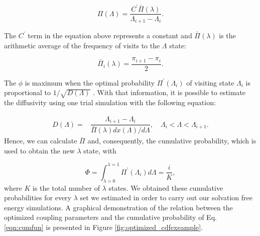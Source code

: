     \begin{equation}
    \Pi (\Lambda) = \dfrac{C^{'} \bar{\Pi} (\lambda)}{\Lambda_{i+1} - \Lambda_{i}}.
    \label{eqn:plambda}
    \end{equation}
    
    The $C^{'} $ term in the equation above represents a constant and $\bar{\Pi} (\lambda)$ is the arithmetic average of the frequency of visits to the $\Lambda$ state:
    
    \begin{equation}
    \bar{\Pi}_{i} (\lambda) = \dfrac{\pi_{i+1} - \pi_{i}}{2}.
    \label{eqn:barplambda}
    \end{equation}
    
    The $\phi$ is maximum when the optimal probability $\Pi^{'}(\Lambda_{i})$ of visiting state $\Lambda_{i}$ is proportional to $1/\sqrt{D(\Lambda)}$ \cite{trebst2004}. With that information, it is possible to estimate the diffusivity using one trial simulation with the following equation:
    
    \begin{equation}
    \begin{aligned}
    D(\Lambda) {}=& \dfrac{\Lambda_{i+1} - \Lambda_{i}}{\bar{\Pi} (\lambda) {dx(\Lambda)}/{d \Lambda}}, \quad \Lambda_{i} < \Lambda < \Lambda_{i+1}.
    \end{aligned}
    \label{eqn:diff}
    \end{equation}    
    Hence, we can calculate $\bar{\Pi} $ and, consequently, the cumulative probability, which is used to obtain the new $\lambda$ state, with
    
    \begin{equation}
    \Phi = \int_{\lambda =0}^{\lambda =1} \Pi^{'}(\Lambda_{i}) d \Lambda = \dfrac{i}{K},
    \label{eqn:cumfun}
    \end{equation}
    where $K$ is the total number of $\lambda$ states. We obtained these cumulative probabilities for every $\lambda$ set we estimated in order to carry out our solvation free energy simulations. A graphical demonstration of the relation between the optimized coupling parameters and the cumulative probability of Eq. \ref{eqn:cumfun} is presented in Figure \ref{fig:optimized_cdfexeample}.
    
